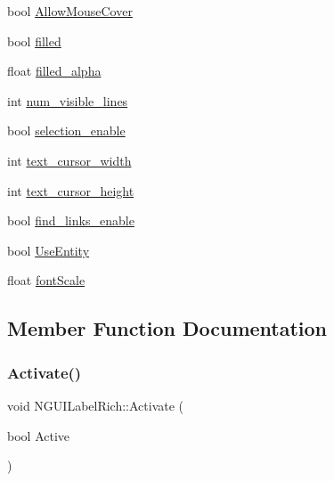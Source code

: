 \begin{DoxyCompactItemize}
\item 
bool \hyperlink{class_n_g_u_i_label_rich_a55edc20f7ec94841c33ac34974400e6e}{Allow\+Mouse\+Cover}
\item 
bool \hyperlink{class_n_g_u_i_label_rich_aa91f0e34c57357e20a11dd128c22ced5}{filled}
\item 
float \hyperlink{class_n_g_u_i_label_rich_aed5d0705fe2f6fba7d95336fe1c6f694}{filled\+\_\+alpha}
\item 
int \hyperlink{class_n_g_u_i_label_rich_a313eec0b812c665083e41fb813b80275}{num\+\_\+visible\+\_\+lines}
\item 
bool \hyperlink{class_n_g_u_i_label_rich_a1ac3c44c518cf21031ed990460f40fc4}{selection\+\_\+enable}
\item 
int \hyperlink{class_n_g_u_i_label_rich_a868bda8048d08e70d270dcc27a1975c1}{text\+\_\+cursor\+\_\+width}
\item 
int \hyperlink{class_n_g_u_i_label_rich_af566cb41807a49e066c13e7483f67e60}{text\+\_\+cursor\+\_\+height}
\item 
bool \hyperlink{class_n_g_u_i_label_rich_a94575777eb161ed89e2596047932ba5b}{find\+\_\+links\+\_\+enable}
\item 
bool \hyperlink{class_n_g_u_i_label_rich_a019ebe0813f868a627f157b71e966b8b}{Use\+Entity}
\item 
float \hyperlink{class_n_g_u_i_label_rich_a267bfdaf2984db7b564e10c0d4142d66}{font\+Scale}
\end{DoxyCompactItemize}


\subsection{Member Function Documentation}
\hypertarget{class_n_g_u_i_label_rich_a5ef1dafc7951089e52d27542bd5911d9}{}\label{class_n_g_u_i_label_rich_a5ef1dafc7951089e52d27542bd5911d9} 
\subsubsection{\texorpdfstring{Activate()}{Activate()}}
{\footnotesize\ttfamily void N\+G\+U\+I\+Label\+Rich\+::\+Activate (\begin{DoxyParamCaption}\item[{bool}]{Active }\end{DoxyParamCaption})}

\hypertarget{class_n_g_u_i_label_rich_a371feb0210cf68e0f7635737bc2f72a6}{}\label{class_n_g_u_i_label_rich_a371feb0210cf68e0f7635737bc2f72a6} 
